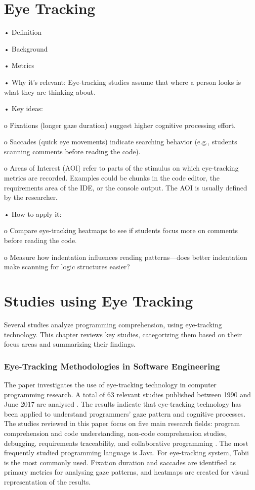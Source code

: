 \section{Eye Tracking}

•	Definition 


•	Background


•	Metrics


•	Why it’s relevant: Eye-tracking studies assume that where a person looks is what they are thinking about.


•	Key ideas:


o	Fixations (longer gaze duration) suggest higher cognitive processing effort.


o	Saccades (quick eye movements) indicate searching behavior (e.g., students scanning comments before reading the code).


o	Areas of Interest (AOI) refer to parts of the stimulus on which eye-tracking metrics are recorded. Examples could be chunks in the code editor, the requirements area of the IDE, or the console output. The AOI is usually defined by the researcher.


•	How to apply it:


o	Compare eye-tracking heatmaps to see if students focus more on comments before reading the code.


o	Measure how indentation influences reading patterns—does better indentation make scanning for logic structures easier?


\section{Studies using Eye Tracking}

Several studies analyze programming comprehension, using eye-tracking technology. This chapter reviews key studies, categorizing them based on their focus areas and summarizing their findings.

\subsubsection{Eye-Tracking Methodologies in Software Engineering}
The paper \citet{obaidellah2018survey} investigates the use of eye-tracking technology in computer programming research. A total of 63 relevant studies published between 1990 and June 2017 are analysed \citet{obaidellah2018survey}. The results indicate that eye-tracking technology has been applied to understand programmers' gaze pattern and cognitive processes. The studies reviewed in this paper focus on five main research fields: program comprehension and code understanding, non-code comprehension studies, debugging, requirements traceability, and collaborative programming \citet{obaidellah2018survey}.  The most frequently studied programming language is Java.  
For eye-tracking system, Tobii is the most commonly used.  Fixation duration and saccades are identified as primary metrics for analysing gaze patterns, and heatmaps are created for visual representation of the results.


